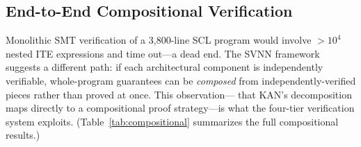 \documentclass[journal,onecolumn]{IEEEtran}
\begin{document}
\subsection{End-to-End Compositional Verification}
\label{sec:compositional}

Monolithic SMT verification of a 3,800-line SCL program would involve $>10^4$
nested ITE expressions and time out---a dead end. The SVNN framework
suggests a different path: if each architectural component is independently
verifiable, whole-program guarantees can be \textit{composed} from
independently-verified pieces rather than proved at once. This observation---
that KAN's decomposition maps directly to a compositional proof strategy---is
what the four-tier verification system exploits.
(Table~\ref{tab:compositional} summarizes the full compositional results.)
\end{document}
